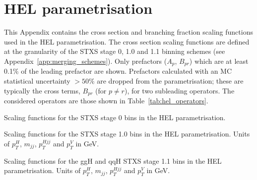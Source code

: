 \chapter{HEL parametrisation}\label{app:hel_parametrisation}

This Appendix contains the cross section and branching fraction scaling functions used in the HEL parametrisation. The cross section scaling functions are defined at the granularity of the STXS stage 0, 1.0 and 1.1 binning schemes (see Appendix~\ref{app:merging_schemes}). Only prefactors ($A_p$, $B_{pr}$) which are at least 0.1\% of the leading prefactor are shown. Prefactors calculated with an MC statistical uncertainty $>50\%$ are dropped from the parametrisation; these are typically the cross terms, $B_{pr}$ (for $p \neq r$), for two subleading operators. The considered operators are those shown in Table~\ref{tab:hel_operators}.

\begin{table}[htb!]
  \centering
  \scriptsize
  \renewcommand{\arraystretch}{4}
  \setlength{\tabcolsep}{6pt}
  \caption[HEL: Scaling functions for the STXS stage 0 bins]
  {
    Scaling functions for the STXS stage 0 bins in the HEL parametrisation.
  }
  \label{tab:hel_parametrisation_stage0}
  \hspace*{-2cm}
  
  \hspace*{-2cm}
\end{table}

\begin{table}[htb!]
  \centering
  \scriptsize
  \renewcommand{\arraystretch}{1.8}
  \setlength{\tabcolsep}{6pt}
  \caption[HEL: Scaling functions for the STXS stage 1 bins]
  {
    Scaling functions for the STXS stage 1.0 bins in the HEL parametrisation. Units of $p_T^H$, $m_{jj}$, $p_T^{Hjj}$ and $p_T^V$ in GeV.
  }
  \label{tab:hel_parametrisation_stage1}
  \hspace*{-2cm}
  
  \hspace*{-2cm}
\end{table}

\begin{table}[htb!]
  \centering
  \scriptsize
  \renewcommand{\arraystretch}{1.8}
  \setlength{\tabcolsep}{6pt}
  \caption[HEL: Scaling functions for the ggH and qqH STXS stage 1.1 bins]
  {
    Scaling functions for the ggH and qqH STXS stage 1.1 bins in the HEL parametrisation. Units of $p_T^H$, $m_{jj}$, $p_T^{Hjj}$ and $p_T^V$ in GeV.
  }
  \label{tab:hel_parametrisation_stage1p1_a}
  \hspace*{-2cm}
  
  \hspace*{-2cm}
\end{table}

